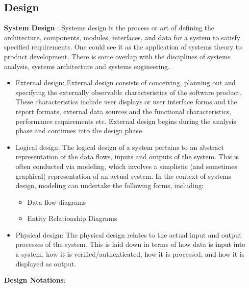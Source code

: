 \newpage
\subsection{Design}
{\bf System Design} : Systems design is the process or art of defining the architecture, components, modules, interfaces, and data for a system to satisfy specified requirements. One could see it as the application of systems theory to product development. There is some overlap with the disciplines of systems analysis, systems architecture and systems engineering.
\begin{itemize}
\item  External design: External design consists of conceiving, planning out and specifying the externally observable characteristics of the software product. These characteristics include user displays or user interface forms and the report formats, external data sources and the functional characteristics, performance requirements etc. External design begins during the analysis phase
and continues into the design phase.
\item  Logical design: The logical design of a system pertains to an abstract representation of the data flows, inputs and outputs of the system. This is often conducted via modeling, which involves a simplistic (and sometimes graphical) representation of an actual system. In the context of systems design, modeling can undertake the following forms, including:
\begin{itemize}
\item Data flow diagrams
\item Entity Relationship Diagrams
\end{itemize}
\item  Physical design: The physical design relates to the actual input and output processes of the system. This is laid down in terms of how data is input into a system, how it is verified/authenticated, how it is processed, and how it is displayed as output.
\end{itemize}
{\bf Design Notations}:\\

